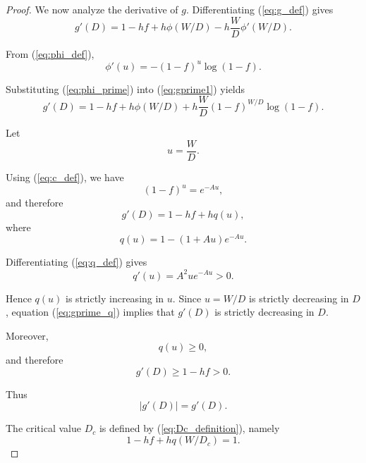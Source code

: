 \documentclass[10pt]{iopart}
\newcommand{\1}{\mathbf{1}}
\begin{document}
\begin{proof}
We now analyze the derivative of $g$. Differentiating (\ref{eq:g_def}) gives
\begin{equation}
g'(D)
=
1-hf+h\phi(W/D)
-h\frac{W}{D}\phi'(W/D).
\label{eq:gprime1}
\end{equation}

From (\ref{eq:phi_def}),
\begin{equation}
\phi'(u)
=
-(1-f)^u\log(1-f).
\label{eq:phi_prime}
\end{equation}

Substituting (\ref{eq:phi_prime}) into (\ref{eq:gprime1}) yields
\begin{equation}
g'(D)
=
1-hf+h\phi(W/D)
+
h\frac{W}{D}(1-f)^{W/D}\log(1-f).
\label{eq:gprime2}
\end{equation}

Let
\begin{equation}
u=\frac{W}{D}.
\label{eq:u_def}
\end{equation}

Using (\ref{eq:c_def}), we have
\begin{equation}
(1-f)^u=e^{-Au},
\label{eq:exp_form}
\end{equation}
and therefore
\begin{equation}
g'(D)
=
1-hf+hq(u),
\label{eq:gprime_q}
\end{equation}
where
\begin{equation}
q(u)=1-(1+Au)e^{-Au}.
\label{eq:q_def}
\end{equation}

Differentiating (\ref{eq:q_def}) gives
\begin{equation}
q'(u)=A^2ue^{-Au}>0.
\label{eq:qprime}
\end{equation}

Hence $q(u)$ is strictly increasing in $u$. Since $u=W/D$ is strictly decreasing in $D$, equation (\ref{eq:gprime_q}) implies that $g'(D)$ is strictly decreasing in $D$.

Moreover,
\begin{equation}
q(u)\ge0,
\label{eq:q_positive}
\end{equation}
and therefore
\begin{equation}
g'(D)\ge 1-hf>0.
\label{eq:gprime_positive}
\end{equation}

Thus
\begin{equation}
|g'(D)|=g'(D).
\label{eq:absolute_removed}
\end{equation}

The critical value $D_c$ is defined by (\ref{eq:Dc_definition}), namely
\begin{equation}
1-hf+hq(W/D_c)=1.
\label{eq:Dc_equation}
\end{equation}


\end{proof}
\end{document}
